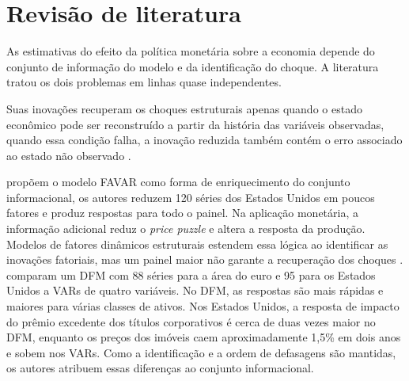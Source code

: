 \documentclass[preprint,authoryear,review,12pt]{elsarticle}
\begin{document}


\section{Revisão de literatura}
\label{sec:literatura}

As estimativas do efeito da política monetária sobre a economia depende do conjunto de informação do modelo e da identificação do choque. A literatura tratou os dois problemas em linhas quase independentes.

Suas inovações recuperam os choques estruturais apenas quando o estado econômico pode ser reconstruído a partir da história das variáveis observadas, quando essa condição falha, a inovação reduzida também contém o erro associado ao estado não observado \citep{villaverde}.

\cite{bernanke} propõem o modelo FAVAR como forma de enriquecimento do conjunto informacional, os autores reduzem 120 séries dos Estados Unidos em poucos fatores e produz respostas para todo o painel. Na aplicação monetária, a informação adicional reduz o \textit{price puzzle} e altera a resposta da produção. Modelos de fatores dinâmicos estruturais estendem essa lógica ao identificar as inovações fatoriais, mas um painel maior não garante a recuperação dos choques \citep{STOCK2016415}. \cite{alessi} comparam um DFM com 88 séries para a área do euro e 95 para os Estados Unidos a VARs de quatro variáveis. No DFM, as respostas são mais rápidas e maiores para várias classes de ativos. Nos Estados Unidos, a resposta de impacto do prêmio excedente dos títulos corporativos é cerca de duas vezes maior no DFM, enquanto os preços dos imóveis caem aproximadamente 1,5\% em dois anos e sobem nos VARs. Como a identificação e a ordem de defasagens são mantidas, os autores atribuem essas diferenças ao conjunto informacional.
\end{document}

